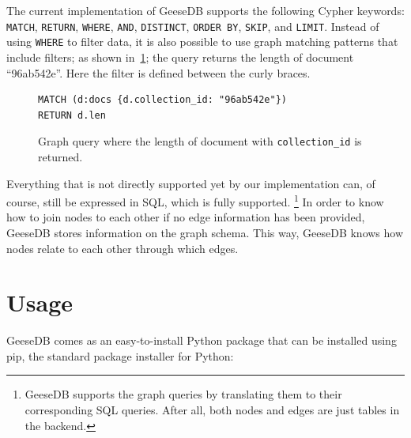 The current implementation of  GeeseDB supports the following Cypher keywords: \texttt{MATCH}, \texttt{RETURN}, \texttt{WHERE}, \texttt{AND}, \texttt{DISTINCT}, \texttt{ORDER BY}, \texttt{SKIP}, and \texttt{LIMIT}. Instead of using \texttt{WHERE} to filter data, it is also possible to use graph matching patterns that include filters; as shown in~\cref{fig:graph_query2}; the query returns the length of document ``96ab542e''. Here the filter is defined between the curly braces. 
\begin{figure}
	\begin{verbatim}
MATCH (d:docs {d.collection_id: "96ab542e"})
RETURN d.len
	\end{verbatim}
	\caption{Graph query where the length of document with \texttt{collection\_id} is returned.}
	\label{fig:graph_query2}
\end{figure}
Everything that is not directly supported yet by our implementation can, of course, still be expressed in SQL, which is fully supported. \footnote{GeeseDB supports the graph queries by translating them to their corresponding SQL queries. After all, both nodes and edges are just tables in the backend.} In order to know how to join nodes to each other if no edge information has been provided, GeeseDB stores information on the graph schema. This way, GeeseDB knows how nodes relate to each other through which edges. 

\section{Usage}
GeeseDB comes as an easy-to-install Python package that can be installed using pip, the standard package installer for Python:

